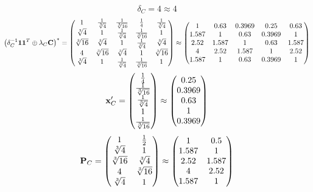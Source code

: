 \documentclass[10pt,a4paper]{article}
\begin{document}
	\[
		\delta_{C} = {{4}} {}\approx 4
	\]
	\[
		\left(\delta_{C}^{-1}\bold{11}^T \oplus \lambda_{C}\bold{C}\right)^* = 
		\begin{pmatrix}
			{1} {} & \frac{1} {\sqrt[3]{4}} & \frac{1} {\sqrt[3]{16}} & \frac{1} {{4}} & \frac{1} {\sqrt[3]{4}} \\
			{\sqrt[3]{4}} {} & {1} {} & \frac{1} {\sqrt[3]{4}} & \frac{1} {\sqrt[3]{16}} & {1} {} \\
			{\sqrt[3]{16}} {} & {\sqrt[3]{4}} {} & {1} {} & \frac{1} {\sqrt[3]{4}} & {\sqrt[3]{4}} {} \\
			{{4}} {} & {\sqrt[3]{16}} {} & {\sqrt[3]{4}} {} & {1} {} & {\sqrt[3]{16}} {} \\
			{\sqrt[3]{4}} {} & {1} {} & \frac{1} {\sqrt[3]{4}} & \frac{1} {\sqrt[3]{16}} & {1} {} \\
		\end{pmatrix}
		\approx
		\begin{pmatrix}
			1        & 0.63     & 0.3969   & 0.25     & 0.63     \\
			1.587    & 1        & 0.63     & 0.3969   & 1        \\
			2.52     & 1.587    & 1        & 0.63     & 1.587    \\
			4        & 2.52     & 1.587    & 1        & 2.52     \\
			1.587    & 1        & 0.63     & 0.3969   & 1        \\
		\end{pmatrix}
	\]
	\[
		\bold{x}'_{C} = 
		\begin{pmatrix}
			\frac{1} {{4}} \\
			\frac{1} {\sqrt[3]{16}} \\
			\frac{1} {\sqrt[3]{4}} \\
			{1} {} \\
			\frac{1} {\sqrt[3]{16}} \\
		\end{pmatrix}
		\approx
		\begin{pmatrix}
			0.25     \\
			0.3969   \\
			0.63     \\
			1        \\
			0.3969   \\
		\end{pmatrix}
	\]
	\[
		\bold{P}_{C} = 
		\begin{pmatrix}
			{1} {} & \frac{1} {{2}} \\
			{\sqrt[3]{4}} {} & {1} {} \\
			{\sqrt[3]{16}} {} & {\sqrt[3]{4}} {} \\
			{{4}} {} & {\sqrt[3]{16}} {} \\
			{\sqrt[3]{4}} {} & {1} {} \\
		\end{pmatrix}
		\approx
		\begin{pmatrix}
			1        & 0.5      \\
			1.587    & 1        \\
			2.52     & 1.587    \\
			4        & 2.52     \\
			1.587    & 1        \\
		\end{pmatrix}
	\]
\end{document}
